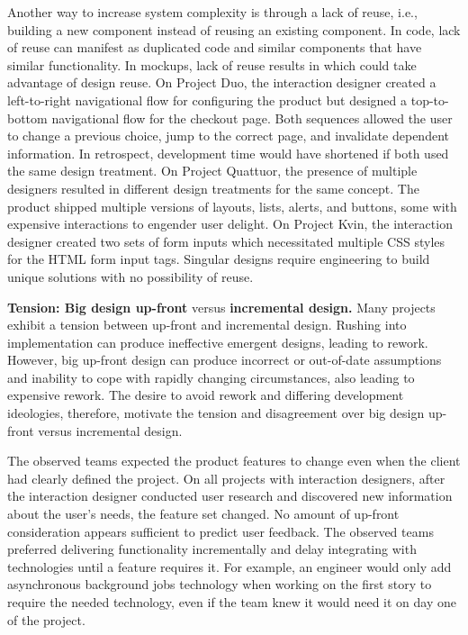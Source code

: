 Another way to increase system complexity is through a lack of reuse, i.e., building a new component instead of reusing an existing component. In code, lack of reuse can manifest as duplicated code and similar components that have similar functionality. In mockups, lack of reuse results in  which could take advantage of design reuse. On Project Duo, the interaction designer created a left-to-right navigational flow for configuring the product but designed a top-to-bottom navigational flow for the checkout page. Both sequences allowed the user to change a previous choice, jump to the correct page, and invalidate dependent information. In retrospect, development time would have shortened if both used the same design treatment. On Project Quattuor, the presence of multiple designers resulted in different design treatments for the same concept. The product shipped multiple versions of layouts, lists, alerts, and buttons, some with expensive interactions to engender user delight. On Project Kvin, the interaction designer created two sets of form inputs which necessitated multiple CSS styles for the HTML form input tags. Singular designs require engineering to build unique solutions with no possibility of reuse.   


\textbf{Tension: Big design up-front} versus \textbf{incremental design.}
Many projects exhibit a tension between up-front and incremental design. Rushing into implementation can produce ineffective emergent designs, leading to rework. However, big up-front design can produce incorrect or out-of-date assumptions and inability to cope with rapidly changing circumstances, also leading to expensive rework. The desire to avoid rework and differing development ideologies, therefore, motivate the tension and disagreement over big design up-front versus incremental design. 


The observed teams expected the product features to change even when the client had clearly defined the project. On all projects with interaction designers, after the interaction designer conducted user research and discovered new information about the user's needs, the feature set changed. No amount of up-front consideration appears sufficient to predict user feedback. The observed teams preferred delivering functionality incrementally and delay integrating with technologies until a feature requires it. For example, an engineer would only add asynchronous background jobs technology when working on the first story to require the needed technology, even if the team knew it would need it on day one of the project.


